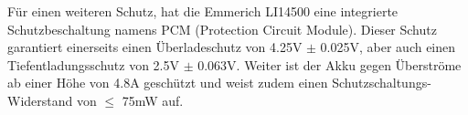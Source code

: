 Für einen weiteren Schutz, hat die Emmerich LI14500 eine integrierte Schutzbeschaltung namens PCM (Protection Circuit Module). Dieser Schutz garantiert einerseits einen Überladeschutz von 4.25V $\pm$ 0.025V, aber auch einen Tiefentladungsschutz von 2.5V $\pm$ 0.063V. Weiter ist der Akku gegen Überströme ab einer Höhe von 4.8A geschützt und weist zudem einen Schutzschaltungs-Widerstand von $\leq$ 75mW auf.

